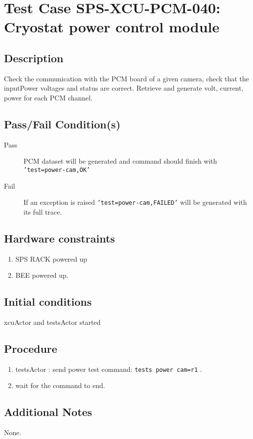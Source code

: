 \section{Test Case SPS-XCU-PCM-040: Cryostat power control module}

\subsection{Description}

Check the communication with the PCM board of a given camera, check that the inputPower voltages and status are correct.
Retrieve and generate volt, current, power for each PCM channel.

\subsection{Pass/Fail Condition(s)}

\begin{description}
\item [Pass] PCM dataset will be generated and command should finish with \texttt{'test=power-cam,OK'}
\item [Fail] If an exception is raised \texttt{'test=power-cam,FAILED'} will be generated with its full trace.

\end{description}

\subsection{Hardware constraints}

\begin{enumerate}
    \item SPS RACK powered up
    \item BEE powered up.
\end{enumerate}

\subsection{Initial conditions}

xcuActor and testsActor started

\subsection{Procedure}

\begin{enumerate}
    \item testsActor : send power test command: \texttt{tests power cam=r1} .
    \item wait for the command to end.
\end{enumerate}

\subsection{Additional Notes}
None.
